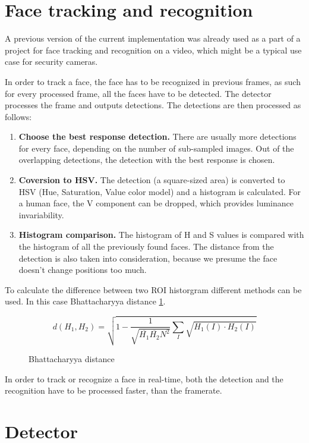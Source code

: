 \section{Face tracking and recognition}

A previous version of the current implementation was already used as a part of a project for face tracking and recognition on a video, which might be a typical use case for security cameras.

In order to track a face, the face has to be recognized in previous frames, as such for every processed frame, all the faces have to be detected. The detector processes the frame and outputs detections. The detections are then processed as follows:

\begin{enumerate}
	\item \textbf{Choose the best response detection.} There are usually more detections for every face, depending on the number of sub-sampled images. Out of the overlapping detections, the detection with the best response is chosen.
	\item \textbf{Coversion to HSV.} The detection (a square-sized area) is converted to HSV (Hue, Saturation, Value color model) and a histogram is calculated. For a human face, the V component can be dropped, which provides luminance invariability.
	\item \textbf{Histogram comparison.} The histogram of H and S values is compared with the histogram of all the previously found faces. The distance from the detection is also taken into consideration, because we presume the face doesn't change positions too much.
\end{enumerate}

To calculate the difference between two ROI historgram different methods can be used. In this case Bhattacharyya distance \ref{eq:bhatta}.

\begin{figure}
\begin{equation}
d(H_{1},H_{2})=\sqrt{1-\frac{1}{\sqrt{\overline{H_{1}}\overline{H_{2}}N^2}}\sum\limits_{I}\sqrt{H_{1}(I) \cdot H_{2}(I)}}
\end{equation}
\caption{Bhattacharyya distance}
\label{eq:bhatta}
\end{figure}

In order to track or recognize a face in real-time, both the detection and the recognition have to be processed faster, than the framerate.

\section{Detector}

